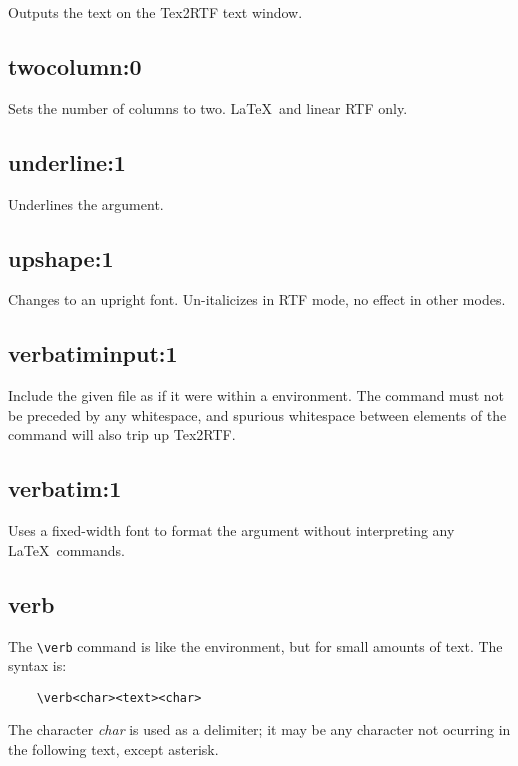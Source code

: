 Outputs the text on the Tex2RTF text window.

\subsection*{twocolumn:0}\label{twocolumn}

Sets the number of columns to two. \LaTeX\ and linear RTF only.

\subsection*{underline:1}\label{underline}

Underlines the argument.
  
\subsection*{upshape:1}\label{upshape}

Changes to an upright font. Un-italicizes in RTF mode, no effect in other modes.

\subsection*{verbatiminput:1}\label{verbatiminput}

Include the given file as if it were within a \rtfsp
environment. The command must not be preceded by any whitespace,
and spurious whitespace between elements of the command will also
trip up Tex2RTF.

\subsection*{verbatim:1}\label{verbatim}

Uses a fixed-width font to format the argument without interpreting
any \LaTeX\ commands.

\subsection*{verb}\label{verb}

The \verb$\verb$ command is like the  environment,
but for small amounts of text. The syntax is:

\begin{verbatim}
    \verb<char><text><char>
\end{verbatim}

The character {\it char} is used as a delimiter; it may be any character
not ocurring in the following text, except asterisk.

